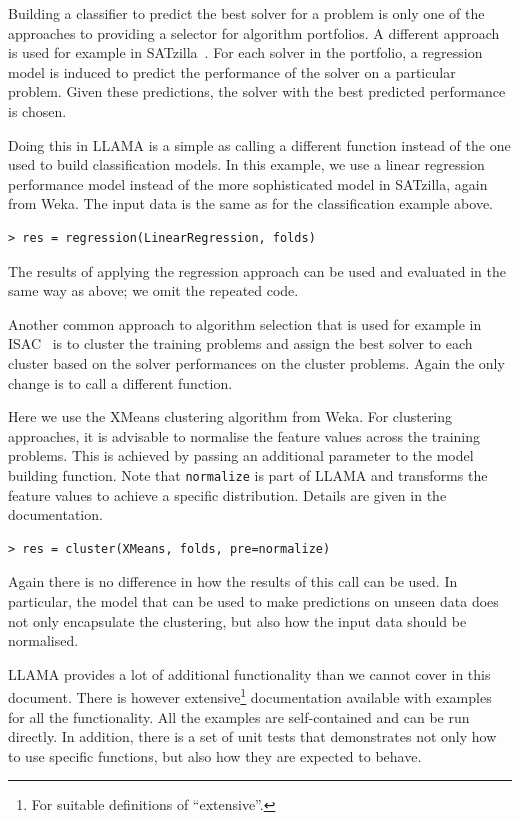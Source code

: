 \documentclass{llncs}
\begin{document}
Building a classifier to predict the best solver for a problem is only one of
the approaches to providing a selector for algorithm portfolios. A different
approach is used for example in SATzilla~\cite{xu_satzilla_2008}. For each
solver in the portfolio, a regression model is induced to predict the
performance of the solver on a particular problem. Given these predictions, the
solver with the best predicted performance is chosen.

Doing this in LLAMA is a simple as calling a different function instead of the
one used to build classification models. In this example, we use a linear
regression performance model instead of the more sophisticated model in
SATzilla, again from Weka. The input data is the same as for the classification
example above.

\begin{verbatim}
> res = regression(LinearRegression, folds)
\end{verbatim}

The results of applying the regression approach can be used and evaluated in the
same way as above; we omit the repeated code.

Another common approach to algorithm selection that is used for example in
ISAC~\cite{kadioglu_isac_2010} is to cluster the training problems and assign
the best solver to each cluster based on the solver performances on the cluster
problems. Again the only change is to call a different function.

Here we use the XMeans clustering algorithm from Weka. For clustering
approaches, it is advisable to normalise the feature values across the training
problems. This is achieved by passing an additional parameter to the model
building function. Note that \verb+normalize+ is part of LLAMA and transforms
the feature values to achieve a specific distribution. Details are given in the
documentation.

\begin{verbatim}
> res = cluster(XMeans, folds, pre=normalize)
\end{verbatim}

Again there is no difference in how the results of this call can be used. In
particular, the model that can be used to make predictions on unseen data does
not only encapsulate the clustering, but also how the input data should be
normalised.

LLAMA provides a lot of additional functionality than we cannot cover in this
document. There is however extensive\footnote{For suitable definitions of
``extensive''.} documentation available with examples for all the functionality.
All the examples are self-contained and can be run directly. In addition, there
is a set of unit tests that demonstrates not only how to use specific functions,
but also how they are expected to behave.
\end{document}
